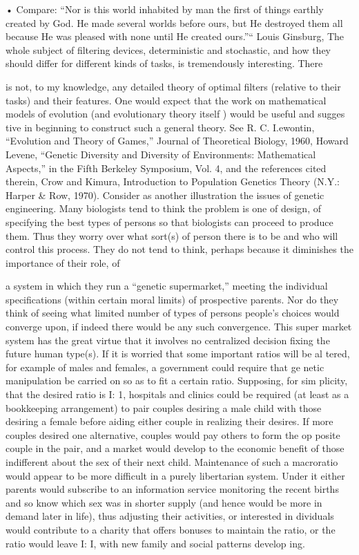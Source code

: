 \documentclass[11pt,openany]{book}
\begin{document}
{• Compare: ``Nor is this world inhabited by man the first of things earthly created by God. He made several worlds before ours, but He destroyed them all because He was pleased with none until He created ours.''`` Louis Ginsburg, The whole subject of filtering devices, deterministic and stochastic, and how they should differ for different kinds of tasks, is tremendously interesting. There\par

is not, to my knowledge, any detailed theory of optimal filters (relative to their tasks) and their features. One would expect that the work on mathematical models of evolution (and evolutionary theory itself ) would be useful and sugges tive in beginning to construct such a general theory. See R. C. I.ewontin, ``Evolution and Theory of Games,'' Journal of Theoretical Biology, 1960, Howard Levene, ``Genetic Diversity and Diversity of Environments: Mathematical Aspects,'' in the Fifth Berkeley Symposium, Vol. 4, and the references cited therein, Crow and Kimura, Introduction to Population Genetics Theory (N.Y.: Harper \& Row, 1970). Consider as another illustration the issues of genetic engineering. Many biologists tend to think the problem is one of design, of specifying the best types of persons so that biologists can proceed to produce them. Thus they worry over what sort(s) of person there is to be and who will control this process. They do not tend to think, perhaps because it diminishes the importance of their role, of\par

a system in which they run a ``genetic supermarket,'' meeting the individual specifications (within certain moral limits) of prospective parents. Nor do they think of seeing what limited number of types of persons people's choices would converge upon, if indeed there would be any such convergence. This super market system has the great virtue that it involves no centralized decision fixing the future human type(s). If it is worried that some important ratios will be al tered, for example of males and females, a government could require that ge netic manipulation be carried on so as to fit a certain ratio. Supposing, for sim plicity, that the desired ratio is I: 1, hospitals and clinics could be required (at least as a bookkeeping arrangement) to pair couples desiring a male child with those desiring a female before aiding either couple in realizing their desires. If more couples desired one alternative, couples would pay others to form the op posite couple in the pair, and a market would develop to the economic benefit of those indifferent about the sex of their next child. Maintenance of such a macroratio would appear to be more difficult in a purely libertarian system. Under it either parents would subscribe to an information service monitoring the recent births and so know which sex was in shorter supply (and hence would be more in demand later in life), thus adjusting their activities, or interested in dividuals would contribute to a charity that offers bonuses to maintain the ratio, or the ratio would leave I: I, with new family and social patterns develop ing.\par

}
\end{document}
